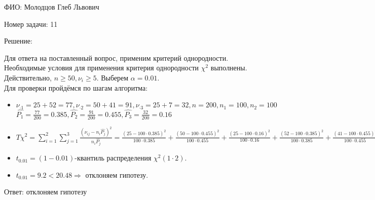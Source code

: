 \documentclass[14pt]{extarticle}
\begin{document}
ФИО: Молодцов Глеб Львович

\vspace{10pt}

Номер задачи: 11

\vspace{10pt}

Решение:

\vspace{10pt}
Для ответа на поставленный вопрос, применим критерий однородности.
Необходимые условия для применения критерия однородности $\chi ^2 $ выполнены. Действительно, $n \geq 50, \nu_i \geq 5$. Выберем $\alpha = 0.01$. \\

Для проверки пройдёмся по шагам алгоритма:
\begin{itemize}
    \item $\nu_{\cdot 1} = 25 + 52 = 77, \nu_{\cdot 2} = 50 + 41 = 91, \nu_{\cdot 3} = 25 + 7 = 32, n = 200, n_1 = 100, n_2 = 100$
    \\ $\hat{P_1} = \frac{77}{200} = 0.385, \hat{P_2} = \frac{91}{200} = 0.455, \hat{P_3} = \frac{32}{200} = 0.16$
    \item $T\chi^2 = \sum\limits_{i=1}^2\sum\limits_{j=1}^3\frac{(\nu_{ij} - n_i\hat{P_j})^2}{n_i\hat{P_j}} = \frac{(25-100\cdot0.385)^2}{100\cdot0.385} + \frac{(50-100\cdot0.455)^2}{100\cdot0.455} +  \frac{(25-100\cdot0.16)^2}{100\cdot0.16} + \frac{(52-100\cdot0.385)^2}{100\cdot0.385} + \frac{(41-100\cdot0.455)^2}{100\cdot0.455} +  \frac{(7-100\cdot0.16)^2}{100\cdot0.16} \approx 20.48$
    \item $t_{0.01} = (1-0.01) $-квантиль распределения $\chi^2(1 \cdot 2) $. \item $t_{0.01} =  9.2 < 20.48 \Rightarrow  $  отклоняем гипотезу.
\end{itemize}

Ответ: отклоняем гипотезу 
\end{document}
